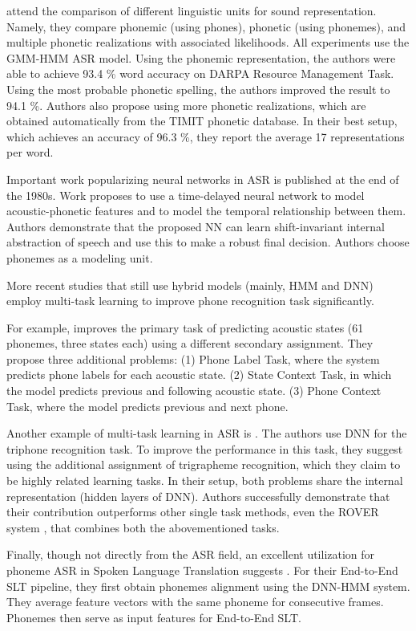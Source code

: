  attend the comparison of different linguistic units for sound representation. Namely, they compare phonemic (using phones), phonetic (using phonemes), and multiple phonetic realizations with associated likelihoods. All experiments use the GMM-HMM ASR model. Using the phonemic representation, the authors were able to achieve 93.4 \% word accuracy on DARPA Resource Management Task. Using the most probable phonetic spelling, the authors improved the result to 94.1 \%. Authors also propose using more phonetic realizations, which are obtained automatically from the TIMIT phonetic database. In their best setup, which achieves an accuracy of 96.3 \%, they report the average 17 representations per word.

Important work popularizing neural networks in ASR is  published at the end of the 1980s. Work proposes to use a time-delayed neural network to model acoustic-phonetic features and to model the temporal relationship between them. Authors demonstrate that the proposed NN can learn shift-invariant internal abstraction of speech and use this to make a robust final decision. Authors choose phonemes as a modeling unit.

More recent studies that still use hybrid models (mainly, HMM and DNN) employ multi-task learning to improve phone recognition task significantly. 

For example,  improves the primary task of predicting acoustic states (61 phonemes, three states each) using a different secondary assignment. They propose three additional problems: (1) Phone Label Task, where the system predicts phone labels for each acoustic state. (2) State Context Task, in which the model predicts previous and following acoustic state. (3) Phone Context Task, where the model predicts previous and next phone.

Another example of multi-task learning in ASR is . The authors use DNN for the triphone recognition task. To improve the performance in this task, they suggest using the additional assignment of trigrapheme recognition, which they claim to be highly related learning tasks. In their setup, both problems share the internal representation (hidden layers of DNN). Authors successfully demonstrate that their contribution outperforms other single task methods, even the ROVER system , that combines both the abovementioned tasks.

Finally, though not directly from the ASR field, an excellent utilization for phoneme ASR in Spoken Language Translation suggests . For their End-to-End SLT pipeline, they first obtain phonemes alignment using the DNN-HMM system. They average feature vectors with the same phoneme for consecutive frames. Phonemes then serve as input features for End-to-End SLT. 

